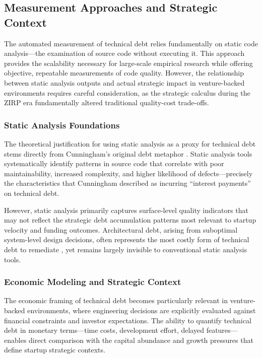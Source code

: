\subsection{Measurement Approaches and Strategic Context}

The automated measurement of technical debt relies fundamentally on static code analysis—the examination of source code without executing it. This approach provides the scalability necessary for large-scale empirical research while offering objective, repeatable measurements of code quality. However, the relationship between static analysis outputs and actual strategic impact in venture-backed environments requires careful consideration, as the strategic calculus during the \ac{ZIRP} era fundamentally altered traditional quality-cost trade-offs.

\subsubsection{Static Analysis Foundations}

The theoretical justification for using static analysis as a proxy for technical debt stems directly from Cunningham's original debt metaphor \citep{cunningham1992wycash}. Static analysis tools systematically identify patterns in source code that correlate with poor maintainability, increased complexity, and higher likelihood of defects—precisely the characteristics that Cunningham described as incurring ``interest payments'' on technical debt.

However, static analysis primarily captures surface-level quality indicators that may not reflect the strategic debt accumulation patterns most relevant to startup velocity and funding outcomes. Architectural debt, arising from suboptimal system-level design decisions, often represents the most costly form of technical debt to remediate \citep{martini2014architecture}, yet remains largely invisible to conventional static analysis tools.

\subsubsection{Economic Modeling and Strategic Context}

The economic framing of technical debt becomes particularly relevant in venture-backed environments, where engineering decisions are explicitly evaluated against financial constraints and investor expectations. The ability to quantify technical debt in monetary terms—time costs, development effort, delayed features—enables direct comparison with the capital abundance and growth pressures that define startup strategic contexts.

